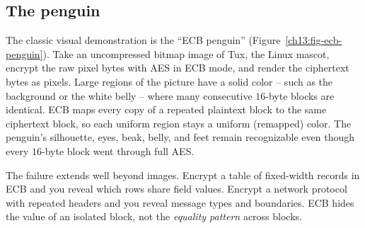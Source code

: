\subsection{The penguin}

\begin{attackbox}
The classic visual demonstration is the ``ECB penguin'' (Figure~\ref{ch13:fig-ecb-penguin}). Take an uncompressed bitmap image of Tux, the Linux mascot, encrypt the raw pixel bytes with AES in ECB mode, and render the ciphertext bytes as pixels. Large regions of the picture have a solid color -- such as the background or the white belly -- where many consecutive $16$-byte blocks are identical. ECB maps every copy of a repeated plaintext block to the same ciphertext block, so each uniform region stays a uniform (remapped) color. The penguin's silhouette, eyes, beak, belly, and feet remain recognizable even though every $16$-byte block went through full AES.

The failure extends well beyond images. Encrypt a table of fixed-width records in ECB and you reveal which rows share field values. Encrypt a network protocol with repeated headers and you reveal message types and boundaries. ECB hides the value of an isolated block, not the \emph{equality pattern} across blocks.
\end{attackbox}

